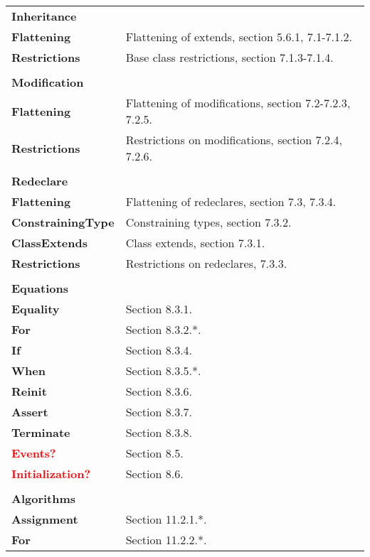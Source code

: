 \documentclass{article}
\begin{document}
\begin{tabular}{l l}
  \textbf{Inheritance} \\
    \indent\textbf{Flattening}       & Flattening of extends, section 5.6.1, 7.1-7.1.2. \\
    \indent\textbf{Restrictions}     & Base class restrictions, section 7.1.3-7.1.4. \\
  \\
  \textbf{Modification} \\
    \indent\textbf{Flattening}       & Flattening of modifications, section 7.2-7.2.3, 7.2.5. \\
    \indent\textbf{Restrictions}     & Restrictions on modifications, section 7.2.4, 7.2.6. \\
  \\
  \textbf{Redeclare} \\
    \indent\textbf{Flattening}       & Flattening of redeclares, section 7.3, 7.3.4. \\
    \indent\textbf{ConstrainingType} & Constraining types, section 7.3.2. \\
    \indent\textbf{ClassExtends}     & Class extends, section 7.3.1. \\
    \indent\textbf{Restrictions}     & Restrictions on redeclares, 7.3.3. \\
  \\
  \textbf{Equations} \\
    \indent\textbf{Equality}         & Section 8.3.1. \\
    \indent\textbf{For}              & Section 8.3.2.*. \\
    \indent\textbf{If}               & Section 8.3.4. \\
    \indent\textbf{When}             & Section 8.3.5.*. \\
    \indent\textbf{Reinit}           & Section 8.3.6. \\
    \indent\textbf{Assert}           & Section 8.3.7. \\
    \indent\textbf{Terminate}        & Section 8.3.8. \\
    \indent\textcolor{red}{\textbf{Events?}} & Section 8.5. \\
    \indent\textcolor{red}{\textbf{Initialization?}} & Section 8.6. \\
  \\
  \textbf{Algorithms} \\
    \indent\textbf{Assignment}       & Section 11.2.1.*. \\
    \indent\textbf{For}              & Section 11.2.2.*. \\

\end{tabular}
\end{document}
